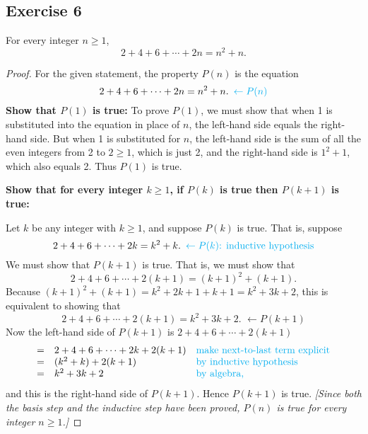 \documentclass[14pt]{extarticle}
\newcommand{\from}{\leftarrow}
\newcommand{\cy}{\color{cyan}}
\begin{document}
\subsection{Exercise 6}
For every integer $n \geq 1$,
\[
2 + 4 + 6 + \cdots + 2n = n^2 + n.
\]
\begin{proof}
For the given statement, the property $P(n)$ is the equation
\[
2 + 4 + 6 + \cdots + 2n = n^2 + n. \,\,\, {\cy \from P(n)}
\]
{\bf Show that $P(1)$ is true:} To prove $P(1)$, we must show that when 1 is substituted into the equation in place of $n$, the left-hand side equals the right-hand side. But when 1 is substituted for $n$, the left-hand side is the sum of all the even integers from 2 to $2 \geq 1$, which is just 2, and the right-hand side is $1^2 + 1$, which also equals 2. Thus $P(1)$ is true.

{\bf Show that for every integer $k \geq 1$, if $P(k)$ is true then $P(k + 1)$ is true:}

Let $k$ be any integer with $k \geq 1$, and suppose $P(k)$ is true. That is, suppose
\[
2 + 4 + 6 + \cdots + 2k = k^2 + k. \,\,\, {\cy \from P(k) \text{: inductive hypothesis}}
\]
We must show that $P(k + 1)$ is true. That is, we must show that
\[
2 + 4 + 6 + \cdots + 2(k + 1) = (k + 1)^2 + (k + 1).
\]
Because $(k + 1)^2 + (k + 1) = k^2 + 2k + 1 + k + 1 =
k^2 + 3k + 2$, this is equivalent to showing that
\[
2 + 4 + 6 + \cdots + 2(k + 1) = k^2 + 3k + 2. \,\, \from P(k + 1)
\]
Now the left-hand side of $P(k + 1)$ is $2 + 4 + 6 + \cdots + 2(k + 1)$
\[
\begin{array}{lll}
= & 2 + 4 + 6 + \cdots + 2k + 2(k + 1) & \text{\cy make next-to-last term explicit} \\
= & (k^2+k) + 2(k+1) & \text{\cy by inductive hypothesis} \\
= & k^2 + 3k + 2 & \text{\cy by algebra,} 
\end{array}
\]
and this is the right-hand side of $P(k + 1)$. Hence $P(k + 1)$ is true. {\it [Since both the basis step and the inductive step have been proved, $P(n)$ is true for every integer $n \geq 1$.]}
\end{proof}
\end{document}
